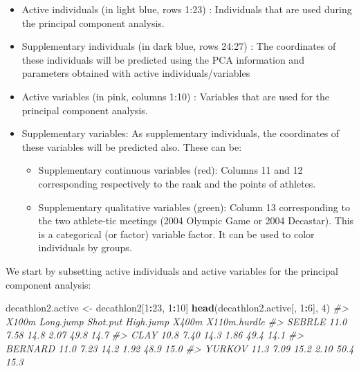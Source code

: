 \documentclass[]{book}
\newenvironment{Shaded}{\begin{snugshade}}{\end{snugshade}}
\newcommand{\CommentTok}[1]{\textcolor[rgb]{0.56,0.35,0.01}{\textit{#1}}}
\newcommand{\DecValTok}[1]{\textcolor[rgb]{0.00,0.00,0.81}{#1}}
\newcommand{\KeywordTok}[1]{\textcolor[rgb]{0.13,0.29,0.53}{\textbf{#1}}}
\newcommand{\NormalTok}[1]{#1}
\newcommand{\OperatorTok}[1]{\textcolor[rgb]{0.81,0.36,0.00}{\textbf{#1}}}
\newcommand{\StringTok}[1]{\textcolor[rgb]{0.31,0.60,0.02}{#1}}
\providecommand{\tightlist}{%
  \setlength{\itemsep}{0pt}\setlength{\parskip}{0pt}}
\begin{document}
\begin{itemize}
\item
  Active individuals (in light blue, rows 1:23) : Individuals that are used during the principal component analysis.
\item
  Supplementary individuals (in dark blue, rows 24:27) : The coordinates of these individuals will be predicted using the PCA information and parameters obtained with active individuals/variables
\item
  Active variables (in pink, columns 1:10) : Variables that are used for the principal component analysis.
\item
  Supplementary variables: As supplementary individuals, the coordinates of these variables will be predicted also. These can be:

  \begin{itemize}
  \tightlist
  \item
    Supplementary continuous variables (red): Columns 11 and 12 corresponding respectively to the rank and the points of athletes.
  \item
    Supplementary qualitative variables (green): Column 13 corresponding to the two athlete-tic meetings (2004 Olympic Game or 2004 Decastar). This is a categorical (or factor) variable factor. It can be used to color individuals by groups.
  \end{itemize}
\end{itemize}

We start by subsetting active individuals and active variables for the principal component analysis:

\begin{Shaded}
\begin{Highlighting}[]
\NormalTok{decathlon2.active <-}\StringTok{ }\NormalTok{decathlon2[}\DecValTok{1}\OperatorTok{:}\DecValTok{23}\NormalTok{, }\DecValTok{1}\OperatorTok{:}\DecValTok{10}\NormalTok{]}
\KeywordTok{head}\NormalTok{(decathlon2.active[, }\DecValTok{1}\OperatorTok{:}\DecValTok{6}\NormalTok{], }\DecValTok{4}\NormalTok{)}
\CommentTok{#>         X100m Long.jump Shot.put High.jump X400m X110m.hurdle}
\CommentTok{#> SEBRLE   11.0      7.58     14.8      2.07  49.8         14.7}
\CommentTok{#> CLAY     10.8      7.40     14.3      1.86  49.4         14.1}
\CommentTok{#> BERNARD  11.0      7.23     14.2      1.92  48.9         15.0}
\CommentTok{#> YURKOV   11.3      7.09     15.2      2.10  50.4         15.3}
\end{Highlighting}
\end{Shaded}
\end{document}
